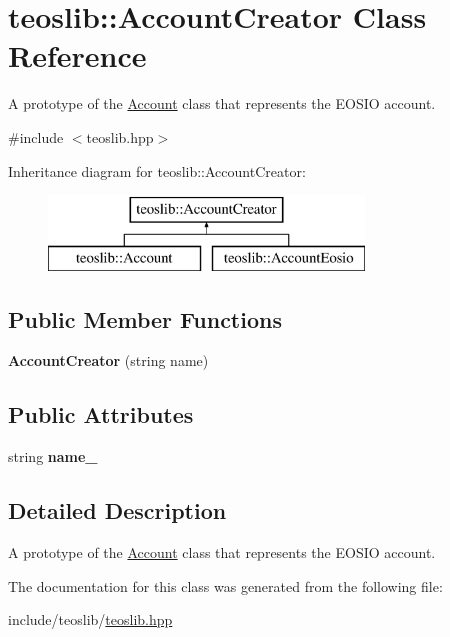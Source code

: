 \hypertarget{classteoslib_1_1_account_creator}{}\section{teoslib\+:\+:Account\+Creator Class Reference}
\label{classteoslib_1_1_account_creator}


A prototype of the \mbox{\hyperlink{classteoslib_1_1_account}{Account}} class that represents the E\+O\+S\+IO account.  




{\ttfamily \#include $<$teoslib.\+hpp$>$}

Inheritance diagram for teoslib\+:\+:Account\+Creator\+:\begin{figure}[H]
\begin{center}
\leavevmode
\includegraphics[height=2.000000cm]{classteoslib_1_1_account_creator}
\end{center}
\end{figure}
\subsection*{Public Member Functions}
\begin{DoxyCompactItemize}
\item 
\mbox{\label{classteoslib_1_1_account_creator_a46505248b199e06552a9f10beff51246}} 
{\bfseries Account\+Creator} (string name)
\end{DoxyCompactItemize}
\subsection*{Public Attributes}
\begin{DoxyCompactItemize}
\item 
\mbox{\label{classteoslib_1_1_account_creator_a1e0ed5f1141c818e965a7581fe034199}} 
string {\bfseries name\+\_\+}
\end{DoxyCompactItemize}


\subsection{Detailed Description}
A prototype of the \mbox{\hyperlink{classteoslib_1_1_account}{Account}} class that represents the E\+O\+S\+IO account. 

The documentation for this class was generated from the following file\+:\begin{DoxyCompactItemize}
\item 
include/teoslib/\mbox{\hyperlink{teoslib_8hpp}{teoslib.\+hpp}}\end{DoxyCompactItemize}
